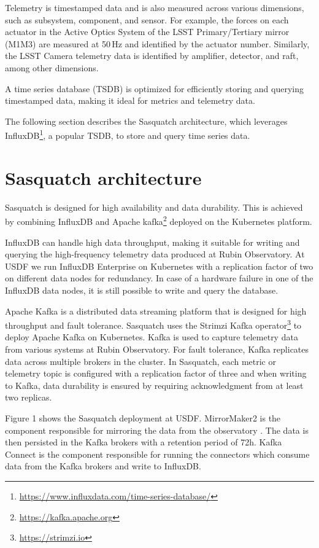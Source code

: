 Telemetry is timestamped data and is also measured across various dimensions, such as subsystem, component, and sensor. For example, the forces on each actuator in the Active Optics System of the LSST Primary/Tertiary mirror (M1M3) are measured at 50\,Hz and identified by the actuator number. Similarly, the LSST Camera telemetry data is identified by amplifier, detector, and raft, among other dimensions.

A time series database (TSDB) is optimized for efficiently storing and querying timestamped data, making it ideal for metrics and telemetry data.

The following section describes the Sasquatch architecture, which leverages InfluxDB\footnote{\url{https://www.influxdata.com/time-series-database/}}, a popular TSDB, to store and query time series data.

\section{Sasquatch architecture}
\label{sec:arch}

Sasquatch is designed for high availability and data durability. This is achieved by combining InfluxDB and Apache kafka\footnote{\url{https://kafka.apache.org}} deployed on the Kubernetes platform. \cite{SQR-029,SQR-068}

InfluxDB can handle high data throughput, making it suitable for writing and querying the high-frequency telemetry data produced at Rubin Observatory. At USDF we run InfluxDB Enterprise on Kubernetes with a replication factor of two on different data nodes for redundancy. In case of a hardware failure in one of the InfluxDB data nodes, it is still possible to write and query the database.

Apache Kafka is a distributed data streaming platform that is designed for high throughput and fault tolerance. Sasquatch uses the Strimzi Kafka operator\footnote{\url{https://strimzi.io}} to deploy Apache Kafka on Kubernetes. Kafka is used to capture telemetry data from various systems at Rubin Observatory. For fault tolerance, Kafka replicates data across multiple brokers in the cluster. In Sasquatch, each metric or telemetry topic is configured with a replication factor of three and when writing to Kafka, data durability is ensured by requiring acknowledgment from at least two replicas.

Figure 1 shows the Sasquatch deployment at USDF. MirrorMaker2 is the component responsible for mirroring the data from the observatory \cite{SQR-050}. The data is then persisted in the Kafka brokers with a retention period of 72h. Kafka Connect is the component responsible for running the connectors which consume data from the Kafka brokers and write to InfluxDB.

